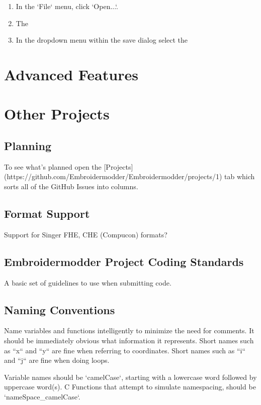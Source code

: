 \documentclass[11pt]{report}
\begin{document}
\begin{enumerate}
\item In the `File` menu, click `Open...`.
\item The 
\item In the dropdown menu within the save dialog select the 
\end{enumerate}

\section{Advanced Features}

\section{Other Projects}

\subsection{Planning}

To see what's planned open the [Projects](https://github.com/Embroidermodder/Embroidermodder/projects/1) tab which sorts all of the GitHub Issues into columns.

\subsection{Format Support}

Support for Singer FHE, CHE (Compucon) formats?

\subsection{Embroidermodder Project Coding Standards}

A basic set of guidelines to use when submitting code.

\subsection{Naming Conventions}

Name variables and functions intelligently to minimize the need for comments.
It should be immediately obvious what information it represents.
Short names such as ``x`` and ``y`` are fine when referring to coordinates.
Short names such as ``i`` and ``j`` are fine when doing loops.

Variable names should be `camelCase`, starting with a lowercase word followed by uppercase word(s).
C Functions that attempt to simulate namespacing, should be `nameSpace\_camelCase`.
\end{document}
